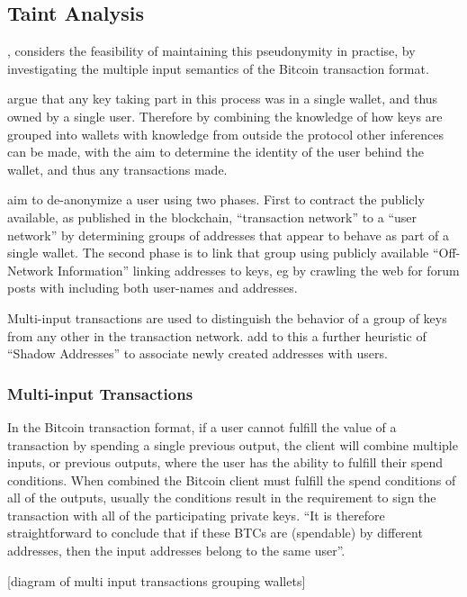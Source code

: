 \subsection{Taint Analysis} \textcite{reid-anon}, considers the feasibility of
maintaining this pseudonymity in practise, by investigating the multiple input
semantics of the Bitcoin transaction format. 

\textcite{reid-anon} argue that any key taking part in this process was in a single
wallet, and thus owned by a single user. Therefore by combining the knowledge of
how keys are grouped into wallets with knowledge from outside the protocol other
inferences can be made, with the aim to determine the identity of the user
behind the wallet, and thus any transactions made.

\textcite{reid-anon} aim to de-anonymize a user using two phases.  First to
contract the publicly available, as published in the blockchain, ``transaction
network'' to a ``user network'' by determining groups of addresses that appear to
behave as part of a single wallet.  The second phase is to  link that group
using publicly available ``Off-Network Information'' linking addresses to keys,
eg by crawling the web for forum posts with including both user-names and
addresses.

Multi-input transactions are used to distinguish the behavior of a group of keys
from any other in the transaction network.  \textcite{eval-priv} add to this a further
heuristic of ``Shadow Addresses'' to associate newly created addresses with
users.

\subsubsection{Multi-input Transactions}
In the Bitcoin transaction format, if a user cannot fulfill the value of a
transaction by spending a single previous output, the client will combine
multiple inputs, or previous outputs, where the user has the ability to fulfill
their spend conditions.  When combined the Bitcoin client must fulfill the spend
conditions of all of the outputs, usually the conditions result in the requirement to sign
the transaction with all of the participating private keys.  ``It is therefore
straightforward to conclude that if these BTCs are (spendable) by different addresses,
then the input addresses belong to the same user''\cite{eval-priv}.

[diagram of multi input transactions grouping wallets]

